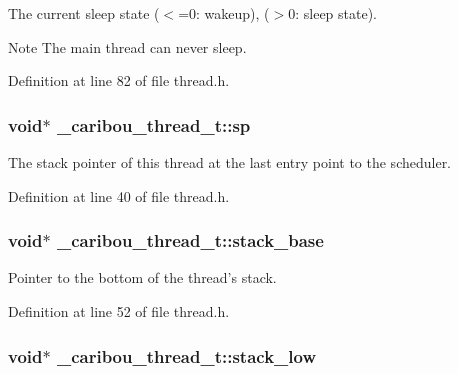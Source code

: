 The current sleep state ($<$=0\-: wakeup), ($>$0\-: sleep state). 

\begin{DoxyNote}{Note}
The main thread can never sleep. 
\end{DoxyNote}


Definition at line 82 of file thread.\-h.

\hypertarget{struct__caribou__thread__t_aceaf2820170f1252157576769bf04672}{
\subsubsection[{sp}]{\setlength{\rightskip}{0pt plus 5cm}void$\ast$ \-\_\-caribou\-\_\-thread\-\_\-t\-::sp}}\label{struct__caribou__thread__t_aceaf2820170f1252157576769bf04672}


The stack pointer of this thread at the last entry point to the scheduler. 



Definition at line 40 of file thread.\-h.

\hypertarget{struct__caribou__thread__t_a6e316e784c771be57958edcd9e95b8d9}{
\subsubsection[{stack\-\_\-base}]{\setlength{\rightskip}{0pt plus 5cm}void$\ast$ \-\_\-caribou\-\_\-thread\-\_\-t\-::stack\-\_\-base}}\label{struct__caribou__thread__t_a6e316e784c771be57958edcd9e95b8d9}


Pointer to the bottom of the thread's stack. 



Definition at line 52 of file thread.\-h.

\hypertarget{struct__caribou__thread__t_a09703c14662151cf8b073626e9144279}{
\subsubsection[{stack\-\_\-low}]{\setlength{\rightskip}{0pt plus 5cm}void$\ast$ \-\_\-caribou\-\_\-thread\-\_\-t\-::stack\-\_\-low}}\label{struct__caribou__thread__t_a09703c14662151cf8b073626e9144279}


